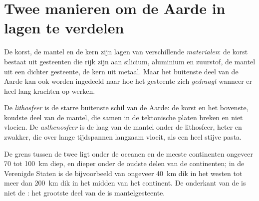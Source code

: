 \section{Twee manieren om de Aarde in lagen te verdelen}

De korst, de mantel en de kern zijn lagen van verschillende
\emph{materialen}: de korst bestaat uit gesteenten die rijk zijn aan silicium,
aluminium en zuurstof, de mantel uit een dichter gesteente, de kern uit metaal.
Maar het buitenste deel van de Aarde kan ook worden ingedeeld naar hoe het
gesteente zich \emph{gedraagt} wanneer er heel lang krachten op werken.

\begin{definition}\label{def:g11:lithosphere-asthenosphere:lithosphere}
De \emph{lithosfeer} is de starre buitenste schil van de Aarde:
de korst en het bovenste, koudste deel van de mantel, die samen in de tektonische
platen breken en niet vloeien. De
\emph{asthenosfeer} is de laag van de mantel onder de
lithosfeer, heter en zwakker, die over lange tijdspannen langzaam vloeit, als een
heel stijve pasta.
\end{definition}

De grens tussen de twee ligt onder de oceanen en de meeste continenten ongeveer
70 tot \qty{100}{km} diep, en dieper onder de oudste delen van de continenten;
in de Verenigde Staten is de  bijvoorbeeld van ongeveer \qty{40}{km}
dik in het westen tot meer dan \qty{200}{km} dik in het midden van het continent.
De onderkant van de  is niet de : het grootste deel van de
 is mantelgesteente.

